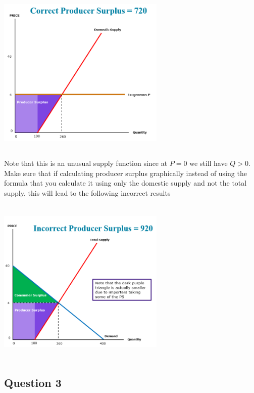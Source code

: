\documentclass{article}
\begin{document}
\begin{center}
  \includegraphics[width=8cm, height=8cm]{pic9}
\end{center}
Note that this is an unusual supply function since at $P=0$ we still have $Q>0$. Make sure that if calculating producer surplus graphically instead of using the formula that you calculate it using only the domestic supply and not the total supply, this will lead to the following incorrect results
\begin{center}
  \includegraphics[width=8cm, height=8cm]{pic10}
\end{center}

\par \vspace{0.8em}
\subsection{Question 3}
\end{document}

